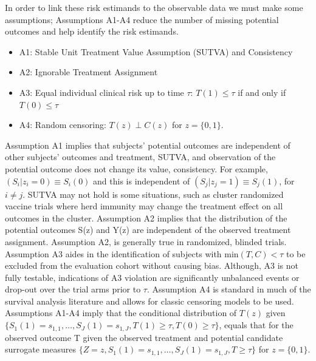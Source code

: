 \documentclass[times, doublespace]{simauth}
\begin{document}
In order to link these risk estimands to the observable data we must make some assumptions; Assumptions A1-A4 reduce the number of missing potential outcomes and help identify the risk estimands.
\begin{itemize}
\item A1: Stable Unit Treatment Value Assumption (SUTVA) and Consistency 
\item A2: Ignorable Treatment Assignment
\item A3: Equal individual clinical risk up to time $\tau$: $T(1)\leq\tau$ if and only if $T(0)\leq\tau$
\item A4: Random censoring: $T(z) \perp C(z)$ for $z=\{0,1\}$.
\end{itemize} 
Assumption A1 implies that subjects' potential outcomes are independent of other subjects' outcomes and treatment, SUTVA, and observation of the potential outcome does not change its value, consistency. For example, $(S_i|z_i=0) \equiv S_i(0)$ and this is independent of $(S_j|z_j=1) \equiv S_j(1)$, for $i \neq j$. SUTVA may not hold is some situations, such as cluster randomized vaccine trials where herd immunity may change the treatment effect on all outcomes in the cluster.  Assumption A2 implies that the distribution of the potential outcomes S(z) and Y(z) are independent of the observed treatment assignment. Assumption A2, is generally true in randomized, blinded trials.  Assumption A3 aides in the identification of subjects with min$(T,C) < \tau$ to be excluded from the evaluation cohort without causing bias. Although, A3 is not fully testable, indications of A3 violation are significantly unbalanced events or drop-out over the trial arms prior to $\tau$. Assumption A4 is standard in much of the survival analysis literature and allows for classic censoring models to be used. Assumptions A1-A4 imply that the conditional distribution of $T(z)$ given $\{S_{1}(1)=s_{1,1},\ldots,S_{J}(1)=s_{1,J}, T(1)\geq\tau, T(0)\geq\tau\}$, equals that for the observed outcome T given the observed treatment and potential candidate surrogate measures $\{Z=z, S_{1}(1)=s_{1,1},\ldots,S_{J}(1)=s_{1,J},T\geq\tau\}$ for $z=\{0,1\}$.
\end{document}
